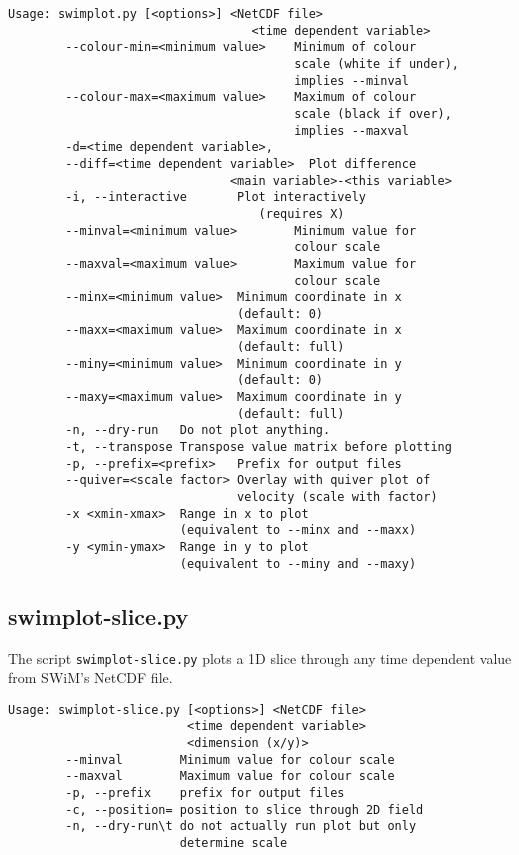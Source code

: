 \documentclass[11pt,a4paper,openright,twoside]{book}
\newcommand{\thecodenospace}{SWiM}
\begin{document}
\begin{verbatim}
Usage: swimplot.py [<options>] <NetCDF file>
                                  <time dependent variable>
        --colour-min=<minimum value>    Minimum of colour
                                        scale (white if under),
                                        implies --minval
        --colour-max=<maximum value>    Maximum of colour
                                        scale (black if over),
                                        implies --maxval
        -d=<time dependent variable>,
        --diff=<time dependent variable>  Plot difference
                               <main variable>-<this variable>
        -i, --interactive       Plot interactively
                                   (requires X)
        --minval=<minimum value>        Minimum value for
                                        colour scale
        --maxval=<maximum value>        Maximum value for
                                        colour scale
        --minx=<minimum value>  Minimum coordinate in x
                                (default: 0)
        --maxx=<maximum value>  Maximum coordinate in x
                                (default: full)
        --miny=<minimum value>  Minimum coordinate in y
                                (default: 0)
        --maxy=<maximum value>  Maximum coordinate in y
                                (default: full)
        -n, --dry-run   Do not plot anything.
        -t, --transpose Transpose value matrix before plotting
        -p, --prefix=<prefix>   Prefix for output files
        --quiver=<scale factor> Overlay with quiver plot of
                                velocity (scale with factor)
        -x <xmin-xmax>  Range in x to plot
                        (equivalent to --minx and --maxx)
        -y <ymin-ymax>  Range in y to plot
                        (equivalent to --miny and --maxy)
\end{verbatim}

\subsection{swimplot-slice.py}
The script \texttt{swimplot-slice.py} plots a 1D slice through any time dependent value from \thecodenospace's NetCDF file.
 
\begin{verbatim}
Usage: swimplot-slice.py [<options>] <NetCDF file>
                         <time dependent variable>
                         <dimension (x/y)>
        --minval        Minimum value for colour scale
        --maxval        Maximum value for colour scale
        -p, --prefix    prefix for output files
        -c, --position= position to slice through 2D field
        -n, --dry-run\t do not actually run plot but only
                        determine scale
\end{verbatim}
\end{document}
